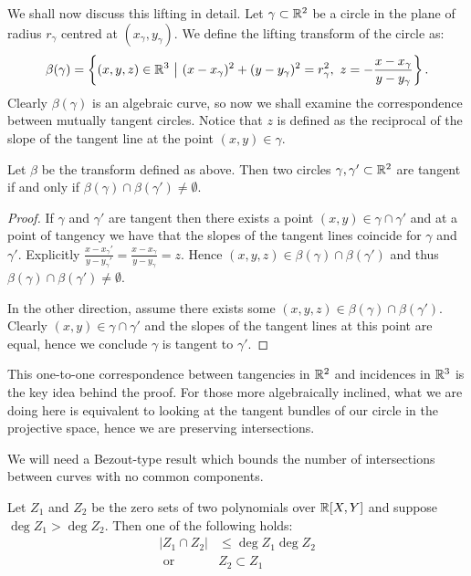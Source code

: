 We shall now discuss this lifting in detail. Let $\gamma \subset \mathbb R^2$ be a circle in the plane of radius $r_{\gamma}$ centred at $(x_\gamma, y_\gamma)$. 
We define the lifting transform of the circle as: \[
    \beta(\gamma) = \left \{ (x,y,z) \in \mathbb R^3 \ \big | \ (x-x_\gamma)^2 + (y-y_\gamma)^2 = r_\gamma^2, \ z = - \frac{x-x_\gamma}{y-y_\gamma} \right \}.
\]  
Clearly $\beta(\gamma)$ is an algebraic curve, so now we shall examine the correspondence between mutually tangent circles. Notice that $z$ is defined as the reciprocal of the slope of the tangent line
at the point $(x,y) \in \gamma$.

\begin{lemma}
    Let $\beta$ be the transform defined as above. 
    Then two circles $\gamma, \gamma' \subset \mathbb R^2$ are tangent if and only if $\beta(\gamma) \cap \beta(\gamma') \neq \emptyset$.    \label{lem:beta-lift}
\end{lemma}
\begin{proof}
If $\gamma$ and $\gamma'$ are tangent then there exists a point $(x,y) \in \gamma \cap \gamma'$ and
at a point of tangency we have that the slopes of the tangent lines coincide for $\gamma$ and $\gamma'$. Explicitly $\frac{x-x_\gamma'}{y - y_\gamma'}= \frac{x-x_\gamma}{y - y_\gamma} = z$.
Hence $(x,y,z) \in \beta(\gamma) \cap \beta(\gamma')$ and thus $ \beta(\gamma) \cap \beta(\gamma') \neq \emptyset$.

In the other direction, assume there exists some $(x,y,z) \in \beta(\gamma) \cap \beta(\gamma')$. 
Clearly $(x,y) \in \gamma \cap \gamma'$ and the slopes of the tangent lines at this point are equal,
hence we conclude $\gamma$ is tangent to $\gamma'$.
\end{proof}
This one-to-one correspondence between tangencies in $\mathbb R^2$ and incidences in $\mathbb R^3$ is the key idea behind the proof. 
For those more algebraically inclined, what we are doing here is equivalent to looking at the tangent bundles of our circle in the projective space, hence we 
are preserving intersections.

We will need a Bezout-type result which bounds the number of intersections between curves with no common components.
\begin{lemma}     \label{lem:Bezout}
   Let $Z_1$ and $Z_2$ be the zero sets of two polynomials over $\mathbb R[X,Y]$ and suppose $\deg Z_1 > \deg Z_2$. Then one of the following holds:
   \begin{align*}
    |Z_1 \cap Z_2 | &\leq \deg Z_1 \deg Z_2 \\
    \text{ or } &Z_2 \subset Z_1
   \end{align*}
\end{lemma}


